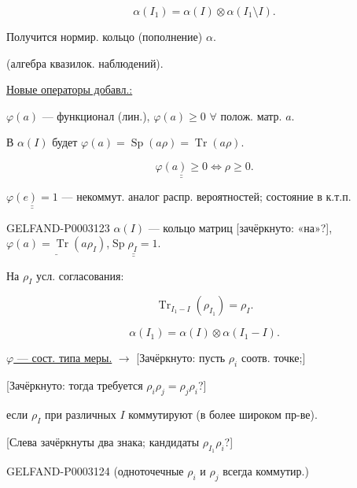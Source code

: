 \begin{equation*}\alpha(I_1)=\alpha(I)\otimes\alpha(I_1\setminus I).\end{equation*}

Получится нормир. кольцо (пополнение) $\alpha$.

(алгебра квазилок. наблюдений).

\uline{Новые операторы добавл.:}

$\varphi(a)$ --- функционал (лин.), $\varphi(a)\ge0$ $\forall$ полож. матр. $a$.

В $\alpha(I)$ будет $\varphi(a)=\operatorname{Sp}(a\rho)=\operatorname{Tr}(a\rho)$.

\begin{equation*}\underline{\underline{\varphi(a)\ge0}}\Longleftrightarrow\rho\ge0.\end{equation*}

$\underline{\underline{\varphi(e)=1}}$ --- некоммут. аналог распр. вероятностей; состояние в к.т.п.

\begin{GelfandAdjacentEvidence}{GELFAND-P000312}{3}
$\alpha(I)$ --- кольцо матриц [зачёркнуто: «на»?], $\underline{\varphi(a)=\operatorname{Tr}(a\rho_I)}$,\quad $\underline{\underline{\operatorname{Sp}\rho_I=1}}$.

\end{GelfandAdjacentEvidence}


На $\rho_I$ усл. согласования:

\begin{equation*}\operatorname{Tr}_{I_1-I}(\rho_{I_1})=\rho_I.\end{equation*}

\begin{equation*}\alpha(I_1)=\alpha(I)\otimes\alpha(I_1-I).\end{equation*}

\uline{$\varphi$ --- сост. типа меры.} $\longrightarrow$ [Зачёркнуто: пусть $\rho_i$ соотв. точке;]

[Зачёркнуто: тогда требуется $\rho_i\rho_j=\rho_j\rho_i$?]

если $\rho_I$ при различных $I$ коммутируют (в более широком пр-ве).

[Слева зачёркнуты два знака; кандидаты $\rho_{I_1}\rho_i$?]

\begin{GelfandAdjacentEvidence}{GELFAND-P000312}{4}
(одноточечные $\rho_i$ и $\rho_j$ всегда коммутир.)

\end{GelfandAdjacentEvidence}




